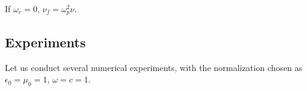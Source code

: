 \documentclass[a4paper,10pt]{article}
\begin{document}
If $\omega_c=0$, $\nu_f=\omega_p^2\nu$.













\subsection{Experiments}
Let us conduct several numerical experiments, with the normalization chosen as $\epsilon_0=\mu_0=1$, $\omega=c=1$.
\end{document}
